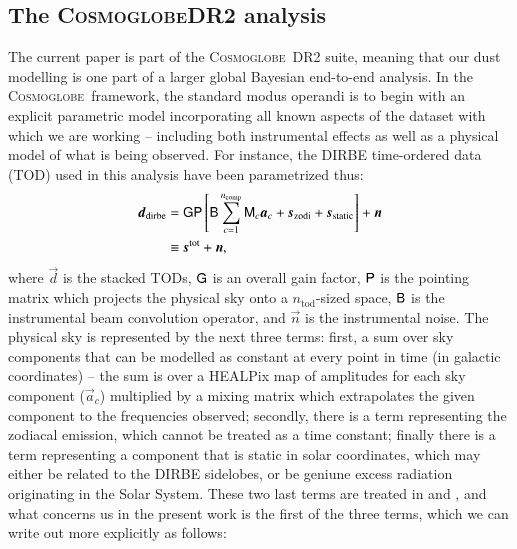 \documentclass{aa}
\newcommand{\dv}[0]{\vec{d}}
\newcommand{\s}[0]{\vec{s}}
\newcommand{\M}[0]{\tens{M}}
\renewcommand{\P}[0]{\tens{P}}
\newcommand{\G}[0]{\tens{G}}
\newcommand{\B}[0]{\tens{B}}
\renewcommand{\a}[0]{\vec{a}}
\newcommand{\n}[0]{\vec{n}}
\def\Cosmoglobe{\textsc{Cosmoglobe}}
\begin{document}
\subsection{The \Cosmoglobe DR2 analysis}
The current paper is part of the \Cosmoglobe\ DR2 suite, meaning that our dust
modelling is one part of a larger global Bayesian end-to-end analysis. In the
\Cosmoglobe\ framework, the standard modus operandi is to begin with an explicit
parametric model incorporating all known aspects of the dataset with which we
are working -- including both instrumental effects as well as a physical model
of what is being observed. For instance, the DIRBE time-ordered data (TOD) used
in this analysis have been parametrized thus:
\begin{align}
	\label{eq:model}
    \dv_{\mathrm{dirbe}} &=\G\P\left[\B\sum_{c=1}^{n_{\mathrm{comp}}}\M_c\a_c+\s_{\mathrm{zodi}} +
          \s_{\mathrm{static}}\right] + \n \\
                         & \equiv \s^{\mathrm{tot}} + \n \nonumber,
\end{align}
where $\dv$ is the stacked TODs, $\G$ is an overall gain factor, $\P$ is the
pointing matrix which projects the physical sky onto a $n_{\mathrm{tod}}$-sized
space, $\B$ is the instrumental beam convolution operator, and $\n$ is the
instrumental noise. The physical sky is represented by the next three terms:
first, a sum over sky components that can be modelled as constant at every
point in time (in galactic coordinates) -- the sum is over a HEALPix map of
amplitudes for each sky component ($\a_c$) multiplied by a mixing matrix which
extrapolates the given component to the frequencies observed; secondly, there
is a term representing the zodiacal emission, which cannot be treated as a time
constant; finally there is a term representing a component that is static in
solar coordinates, which may either be related to the DIRBE sidelobes, or be
geniune excess radiation originating in the Solar System. These two last terms
are treated in \citet{CG02_02} and \citet{CG02_03}, and what concerns us in the
present work is the first of the three terms, which we can write out more
explicitly as follows:
\end{document}
